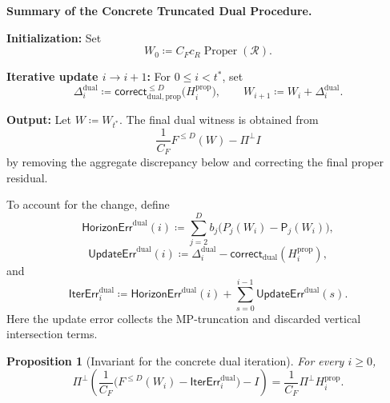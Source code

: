 \documentclass[12pt]{article}
\newtheorem{proposition}[theorem]{Proposition}
\newcommand{\calR}{\mathcal{R}}
\newcommand{\calS}{\mathcal{S}}
\newcommand{\corr}{\mathsf{correct}}
\newcommand{\fp}{\mathsf{P}}
\newcommand{\calL}{\mathcal{L}}
\begin{document}
\begin{mdframed}[linewidth=0.2pt]
\textbf{Summary of the Concrete Truncated Dual Procedure.}

\medskip
\textbf{Initialization:}
Set
\[
    W_0
    \coloneqq
    C_Fc_R\operatorname{Proper}(\calR).
\]

\medskip
\textbf{Iterative update \(i\to i+1\):}
For \(0\leq i<t^\ast\), set
\[
    \Delta_i^{\mathrm{dual}}
    \coloneqq
    \corr_{\mathrm{dual,prop}}^{\leq D}
    \bigl(H_i^{\mathrm{prop}}\bigr),
    \qquad
    W_{i+1}\coloneqq W_i+\Delta_i^{\mathrm{dual}}.
\]

\medskip
\textbf{Output:}
Let \(W\coloneqq W_{t^\ast}\). The final dual witness is obtained from
\[
    \frac1{C_F}F^{\leq D}(W)-\Pi^\perp I
\]
by removing the aggregate discrepancy below and correcting the final
proper residual.
\end{mdframed}
To account for the change, define
\[
    \mathsf{HorizonErr}^{\mathrm{dual}}(i)
    \coloneqq
    \sum_{j=2}^{D}b_j
    \bigl(P_j(W_i)-\fp_j(W_i)\bigr),
\]
\[
    \mathsf{UpdateErr}^{\mathrm{dual}}(i)
    \coloneqq
    \Delta_i^{\mathrm{dual}}
    -
    \corr_{\mathrm{dual}}(H_i^{\mathrm{prop}}),
\]
and
\[
    \mathsf{IterErr}^{\mathrm{dual}}_i
    \coloneqq
    \mathsf{HorizonErr}^{\mathrm{dual}}(i)
    +
    \sum_{s=0}^{i-1}
    \mathsf{UpdateErr}^{\mathrm{dual}}(s).
\]
Here the update error collects the MP-truncation and discarded vertical
intersection terms.

\begin{proposition}[Invariant for the concrete dual iteration]
\label{prop:concrete-dual-iteration-invariant}
For every \(i\geq0\),
\[
    \Pi^\perp
    \left(
        \frac1{C_F}
        \bigl(
            F^{\leq D}(W_i)
            -
            \mathsf{IterErr}^{\mathrm{dual}}_i
        \bigr)
        -
        I
    \right)
    =
    \frac1{C_F}\Pi^\perp H_i^{\mathrm{prop}}.
\]
\end{proposition}
%
%
%
\end{document}
